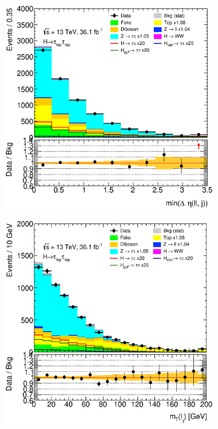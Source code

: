 \begin{figure}[htb]
\begin{subfigure}[t]{0.3\textwidth}
    \end{subfigure}
    \begin{subfigure}[t]{0.3\textwidth}
        \includegraphics[width=\textwidth]{./plots/mva/modeling/input_vars/BOOST_DF/ll-CutMVABoostedCatDF-MinDEtaDilepJets-lin.eps}
    \end{subfigure}
    \begin{subfigure}[t]{0.3\textwidth}
        \includegraphics[width=\textwidth]{./plots/mva/modeling/input_vars/BOOST_DF/ll-CutMVABoostedCatDF-MtLep0-lin.eps}

\end{subfigure}
\end{figure}
